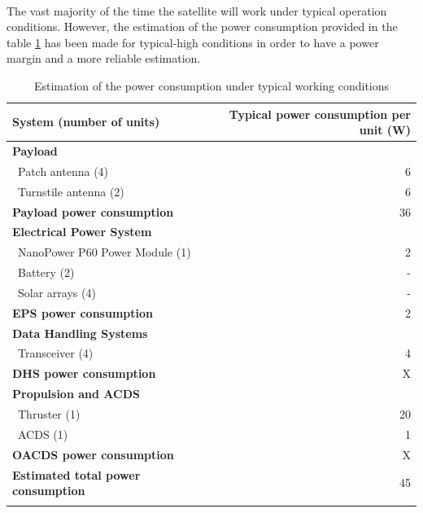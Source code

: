 \paragraph{}The vast majority of the time the satellite will work under typical operation conditions. However, the estimation of the power consumption provided in the table \ref{powerestimation} has been made for typical-high conditions in order to have a power margin and a more reliable estimation.


\begin{longtable}{| l | r | }
\hline
\rowcolor[gray]{0.80}	\textbf{System (number of units)} &  \textbf{Typical power consumption per unit (W)} \\
\hline
\endfirsthead

\rowcolor[gray]{0.85} \textbf{Payload} &  \\
	   ~Patch antenna (4) & 6 \\
	   ~Turnstile antenna (2) & 6 \\
	   \rowcolor[gray]{0.95} \textbf{Payload power consumption} & 36 \\
	   \hline
	\hline

\rowcolor[gray]{0.85} \textbf{Electrical Power System} &  \\
	   ~NanoPower P60 Power Module (1) & 2 \\
	   ~Battery (2) & - \\
	   ~Solar arrays (4) & -\\
	   \rowcolor[gray]{0.95} \textbf{EPS power consumption} & 2 \\
	   \hline
	\hline
	
\rowcolor[gray]{0.85} \textbf{Data Handling Systems} &  \\
	   ~Transceiver (4) & 4 \\
	   \rowcolor[gray]{0.95} \textbf{DHS power consumption} & X \\
	   \hline
	\hline
	
\rowcolor[gray]{0.85} \textbf{Propulsion and ACDS} &  \\
	   ~Thruster (1) & 20 \\
	   ~ACDS (1) & 1 \\
	   \rowcolor[gray]{0.95} \textbf{OACDS power consumption} & X \\
	   \hline
	\hline

\rowcolor[gray]{0.65} \textbf{Estimated total power consumption} & 45 \\

\caption{Estimation of the power consumption under typical working conditions}
\label{powerestimation}
\end{longtable}

